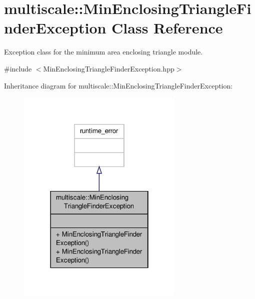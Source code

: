 \hypertarget{classmultiscale_1_1MinEnclosingTriangleFinderException}{\section{multiscale\-:\-:Min\-Enclosing\-Triangle\-Finder\-Exception Class Reference}
\label{classmultiscale_1_1MinEnclosingTriangleFinderException}
}


Exception class for the minimum area enclosing triangle module.  




{\ttfamily \#include $<$Min\-Enclosing\-Triangle\-Finder\-Exception.\-hpp$>$}



Inheritance diagram for multiscale\-:\-:Min\-Enclosing\-Triangle\-Finder\-Exception\-:
\nopagebreak
\begin{figure}[H]
\begin{center}
\leavevmode
\includegraphics[width=226pt]{classmultiscale_1_1MinEnclosingTriangleFinderException__inherit__graph}
\end{center}
\end{figure}


